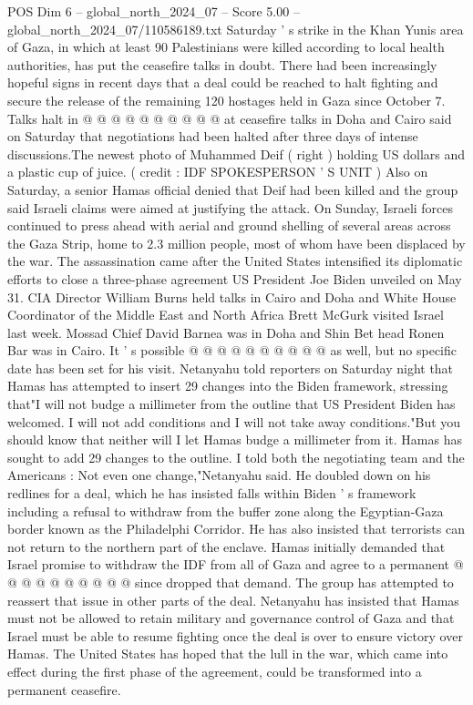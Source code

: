 \begin{textsample}{POS Dim 6 – global\_north\_2024\_07 – Score 5.00 – global\_north\_2024\_07/110586189.txt}
Saturday ' s strike in the Khan Yunis area of Gaza, in which at least 90 Palestinians were killed according to local health authorities, has put the ceasefire talks in doubt.
There had been increasingly hopeful signs in recent days that a deal could be reached to halt fighting and secure the release of the remaining 120 hostages held in Gaza since October 7.
Talks halt in @ @ @ @ @ @ @ @ @ @ at ceasefire talks in Doha and Cairo said on Saturday that negotiations had been halted after three days of intense discussions.The newest photo of Muhammed Deif ( right ) holding US dollars and a plastic cup of juice. ( credit : IDF SPOKESPERSON ' S UNIT ) Also on Saturday, a senior Hamas official denied that Deif had been killed and the group said Israeli claims were aimed at justifying the attack.
On Sunday, Israeli forces continued to press ahead with aerial and ground shelling of several areas across the Gaza Strip, home to 2.3 million people, most of whom have been displaced by the war.
The assassination came after the United States intensified its diplomatic efforts to close a three-phase agreement US President Joe Biden unveiled on May 31.
CIA Director William Burns held talks in Cairo and Doha and White House Coordinator of the Middle East and North Africa Brett McGurk visited Israel last week.
Mossad Chief David Barnea was in Doha and Shin Bet head Ronen Bar was in Cairo.
It ' s possible @ @ @ @ @ @ @ @ @ @ as well, but no specific date has been set for his visit.
Netanyahu told reporters on Saturday night that Hamas has attempted to insert 29 changes into the Biden framework, stressing that"I will not budge a millimeter from the outline that US President Biden has welcomed.
I will not add conditions and I will not take away conditions."But you should know that neither will I let Hamas budge a millimeter from it.
Hamas has sought to add 29 changes to the outline.
I told both the negotiating team and the Americans : Not even one change,"Netanyahu said.
He doubled down on his redlines for a deal, which he has insisted falls within Biden ' s framework including a refusal to withdraw from the buffer zone along the Egyptian-Gaza border known as the Philadelphi Corridor.
He has also insisted that terrorists can not return to the northern part of the enclave.
Hamas initially demanded that Israel promise to withdraw the IDF from all of Gaza and agree to a permanent @ @ @ @ @ @ @ @ @ @ since dropped that demand.
The group has attempted to reassert that issue in other parts of the deal.
Netanyahu has insisted that Hamas must not be allowed to retain military and governance control of Gaza and that Israel must be able to resume fighting once the deal is over to ensure victory over Hamas.
The United States has hoped that the lull in the war, which came into effect during the first phase of the agreement, could be transformed into a permanent ceasefire.

\end{textsample}
